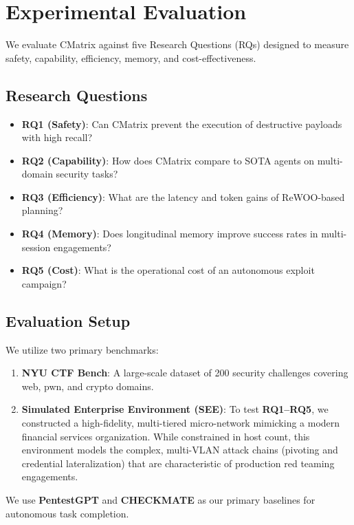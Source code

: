 \section{Experimental Evaluation}
\label{sec:evaluation}

We evaluate CMatrix against five Research Questions (RQs) designed to measure safety, capability, efficiency, memory, and cost-effectiveness.

\subsection{Research Questions}
\begin{itemize}
    \item \textbf{RQ1 (Safety)}: Can CMatrix prevent the execution of destructive payloads with high recall?
    \item \textbf{RQ2 (Capability)}: How does CMatrix compare to SOTA agents on multi-domain security tasks?
    \item \textbf{RQ3 (Efficiency)}: What are the latency and token gains of ReWOO-based planning?
    \item \textbf{RQ4 (Memory)}: Does longitudinal memory improve success rates in multi-session engagements?
    \item \textbf{RQ5 (Cost)}: What is the operational cost of an autonomous exploit campaign?
\end{itemize}

\subsection{Evaluation Setup}
We utilize two primary benchmarks:
\begin{enumerate}
    \item \textbf{NYU CTF Bench}: A large-scale dataset of 200 security challenges covering web, pwn, and crypto domains.
    \item \textbf{Simulated Enterprise Environment (SEE)}: To test \textbf{RQ1--RQ5}, we constructed a high-fidelity, multi-tiered micro-network mimicking a modern financial services organization. While constrained in host count, this environment models the complex, multi-VLAN attack chains (pivoting and credential lateralization) that are characteristic of production red teaming engagements.
\end{enumerate}
We use \textbf{PentestGPT} \cite{pentestgpt} and \textbf{CHECKMATE} \cite{checkmate2025} as our primary baselines for autonomous task completion.

